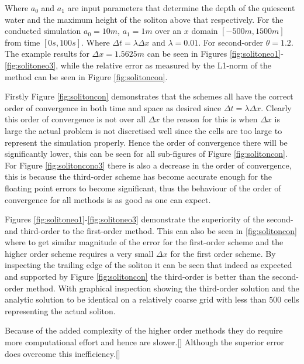 \documentclass[SingleSpace,12pt]{Serre_ASCE}
\begin{document}
Where $a_0$ and $a_1$ are input parameters that determine the depth of the quiescent water and the maximum height of the soliton above that respectively. For the conducted simulation $a_0 = 10m$, $a_1 = 1m$ over an $x$ domain $\left[-500m,1500m\right]$ from time $\left[0s,100s\right]$. Where $\Delta t = \lambda \Delta x$ and $\lambda = 0.01$. For second-order $\theta = 1.2$. The example results for $\Delta x = 1.5625m$ can be seen in Figures \ref{fig:solitoneo1}-\ref{fig:solitoneo3}, while the relative error as measured by the L1-norm of the method can be seen in Figure \ref{fig:solitoncon}.

Firstly Figure \ref{fig:solitoncon} demonstrates that the schemes all have the correct order of convergence in both time and space as desired since $\Delta t = \lambda \Delta x$. Clearly this order of convergence is not over all $\Delta x$ the reason for this is when $\Delta x$ is large the actual problem is not discretised well since the cells are too large to represent the simulation properly. Hence the order of convergence there will be significantly lower, this can be seen for all sub-figures of Figure \ref{fig:solitoncon}. For Figure \ref{fig:solitoncono3} there is also a decrease in the order of convergence, this is because the third-order scheme has become accurate enough for the floating point errors to become significant, thus the behaviour of the order of convergence for all methods is as good as one can expect. 

Figures \ref{fig:solitoneo1}-\ref{fig:solitoneo3} demonstrate the superiority of the second- and third-order to the first-order method. This can also be seen in \ref{fig:solitoncon} where to get similar magnitude of the error for the first-order scheme and the higher order scheme requires a very small $\Delta x$ for the first order scheme. By inspecting the trailing edge of the soliton it can be seen that indeed as expected and supported by Figure \ref{fig:solitoncon} the third-order is better than the second-order method. With graphical inspection showing the third-order solution and the analytic solution to be identical on a relatively coarse grid with less than $500$ cells representing the actual soliton. 

Because of the added complexity of the higher order methods they do require more computational effort and hence are slower.[] Although the superior error does overcome this inefficiency.[] 
\end{document}
